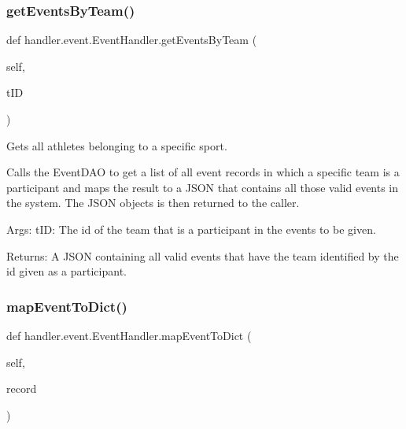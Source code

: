 \subsubsection{\texorpdfstring{get\+Events\+By\+Team()}{getEventsByTeam()}}
{\footnotesize\ttfamily def handler.\+event.\+Event\+Handler.\+get\+Events\+By\+Team (\begin{DoxyParamCaption}\item[{}]{self,  }\item[{}]{t\+ID }\end{DoxyParamCaption})}

\begin{DoxyVerb}Gets all athletes belonging to a specific sport.

Calls the EventDAO to get a list of all event records
in which a specific team is a participant and maps the result 
to a JSON that contains all those valid events in the 
system. The JSON objects is then returned to the caller.

Args:
    tID: The id of the team that is a participant
 in the events to be given.

Returns:
    A JSON containing all valid events that have the team
    identified by the id given as a participant.
\end{DoxyVerb}
 \mbox{\label{classhandler_1_1event_1_1_event_handler_a5e837eb3451d29138a27d95b1ed7575d}} 
\subsubsection{\texorpdfstring{map\+Event\+To\+Dict()}{mapEventToDict()}}
{\footnotesize\ttfamily def handler.\+event.\+Event\+Handler.\+map\+Event\+To\+Dict (\begin{DoxyParamCaption}\item[{}]{self,  }\item[{}]{record }\end{DoxyParamCaption})}

